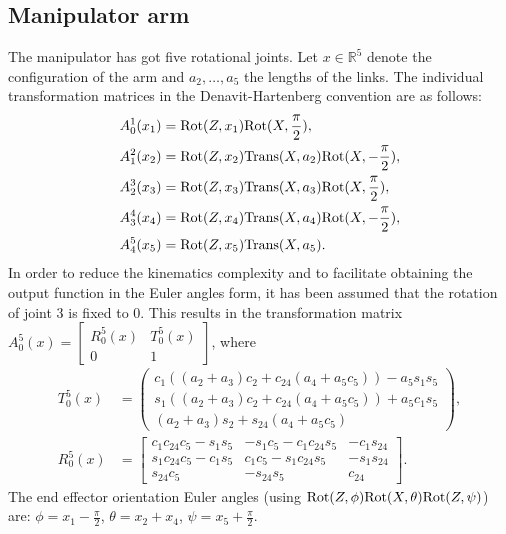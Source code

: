 \subsection{Manipulator arm}
The manipulator has got five rotational joints.
Let $x\in \mathbb{R}^5$ denote the configuration of the arm and $a_2, \dots, a_5$ the lengths of the links. The individual transformation matrices in the Denavit-Hartenberg convention are as follows:
\begin{equation}
\begin{aligned}
A_0^1(x_1) &= \mathrm{Rot}(Z, x_1)\mathrm{Rot}(X, \frac{\pi}{2}),\\
A_1^2(x_2) &= \mathrm{Rot}(Z, x_2)\mathrm{Trans} (X, a_2)\mathrm{Rot}(X, -\frac{\pi}{2}),\\
A_2^3(x_3) &= \mathrm{Rot}(Z, x_3)\mathrm{Trans} (X, a_3)\mathrm{Rot}(X, \frac{\pi}{2}),\\
A_3^4(x_4) &= \mathrm{Rot}(Z, x_4)\mathrm{Trans} (X, a_4)\mathrm{Rot}(X, -\frac{\pi}{2}),\\
A_4^5(x_5) &= \mathrm{Rot}(Z, x_5)\mathrm{Trans} (X, a_5).
\end{aligned}
\end{equation}
In order to reduce the kinematics complexity and to facilitate obtaining the output function in the Euler angles form, it has been assumed that the rotation of joint 3 is fixed to $0$. This results in the transformation matrix $
A_0^5(x)=\begin{bmatrix}
R_0^5(x) & T_0^5(x)\\
0 & 1
\end{bmatrix}$, 
where
\begin{align}
T_0^5(x) &= \begin{pmatrix}
c_1\left((a_2+a_3)c_2 + c_{24}(a_4+a_5c_5)\right) - a_5s_1s_5\\
s_1\left((a_2+a_3)c_2 + c_{24}(a_4+a_5c_5)\right) + a_5c_1s_5\\
    (a_2+a_3)s_2 + s_{24}(a_4+a_5c_5)
\end{pmatrix},\\
R_0^5(x) &= \begin{bmatrix}
c_1c_{24}c_5-s_1s_5 & -s_1c_5-c_1c_{24}s_5 & -c_1s_{24}\\
s_1c_{24}c_5-c_1s_5 &  c_1c_5-s_1c_{24}s_5 & -s_1s_{24}\\
s_{24}c_5           & -s_{24}s_5           &  c_{24}
\end{bmatrix}.
\end{align}
The end effector orientation Euler angles (using $\mathrm{Rot}(Z,\phi)\mathrm{Rot}(X, \theta)\mathrm{Rot}(Z, \psi)$) are: $\phi=x_1-\frac{\pi}{2}$, $\theta=x_2+x_4$, $\psi=x_5+\frac{\pi}{2}$.

